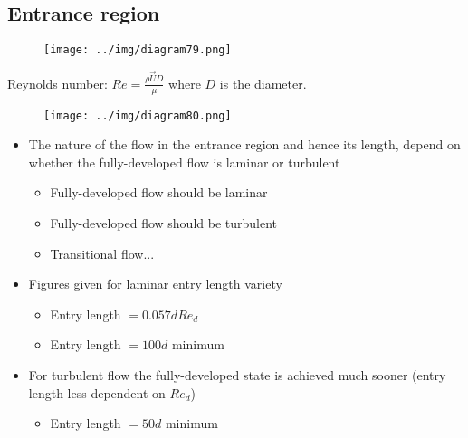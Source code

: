 \documentclass[class=report, crop=false, 12pt,a4paper]{standalone}
\begin{document}
\subsection{Entrance region}
\begin{figure}[H]
  \centering
  \texttt{[image: ../img/diagram79.png]}
  \caption{}
\end{figure}
Reynolds number: $Re = \frac{\rho \vec{U} D}{\mu}$ where $D$ is the diameter.
\begin{figure}[H]
  \centering
  \texttt{[image: ../img/diagram80.png]}
  \caption{}
\end{figure}
\begin{itemize}
  \item The nature of the flow in the entrance region and hence its length, depend on whether the fully-developed flow is laminar or turbulent
  \begin{itemize}
    \item {} Fully-developed flow should be laminar
    \item {} Fully-developed flow should be turbulent
    \item {} Transitional flow...
  \end{itemize}
  \item Figures given for laminar entry length variety
  \begin{itemize}
    \item {} Entry length $=0.057 d Re_d$
    \item {} Entry length $=100d$ minimum
  \end{itemize}
  \item For turbulent flow the fully-developed state is achieved much sooner (entry length less dependent on $Re_d$)
  \begin{itemize}
    \item {} Entry length $=50d$ minimum
  \end{itemize}
\end{itemize}
\end{document}
